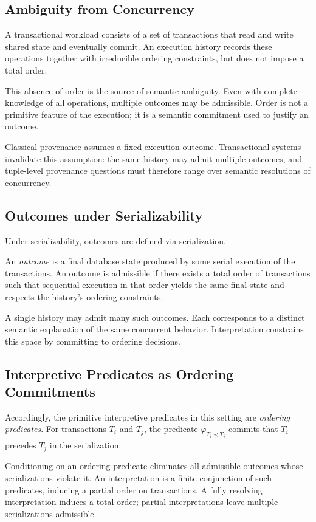 \documentclass[acmsmall,nonacm]{acmart}
\theoremstyle{remark}
\numberwithin{definition}{section}
\numberwithin{theorem}{section}
\numberwithin{lemma}{section}
\numberwithin{corollary}{section}
\numberwithin{remark}{section}
\numberwithin{example}{section}
\numberwithin{observation}{section}
\numberwithin{assumption}{section}
\begin{document}
\subsection{Ambiguity from Concurrency}

A transactional workload consists of a set of transactions that read and write
shared state and eventually commit.
An execution history records these operations together with irreducible ordering
constraints, but does not impose a total order.

This absence of order is the source of semantic ambiguity.
Even with complete knowledge of all operations, multiple outcomes may be
admissible.
Order is not a primitive feature of the execution; it is a semantic commitment
used to justify an outcome.

Classical provenance assumes a fixed execution outcome.
Transactional systems invalidate this assumption: the same history may admit
multiple outcomes, and tuple-level provenance questions must therefore range over
semantic resolutions of concurrency.

\subsection{Outcomes under Serializability}

Under serializability, outcomes are defined via serialization.

An \emph{outcome} is a final database state produced by some serial execution of
the transactions.
An outcome is admissible if there exists a total order of transactions such that
sequential execution in that order yields the same final state and respects the
history’s ordering constraints.

A single history may admit many such outcomes.
Each corresponds to a distinct semantic explanation of the same concurrent
behavior.
Interpretation constrains this space by committing to ordering decisions.

\subsection{Interpretive Predicates as Ordering Commitments}

Accordingly, the primitive interpretive predicates in this setting are
\emph{ordering predicates}.
For transactions $T_i$ and $T_j$, the predicate
$\varphi_{T_i \prec T_j}$ commits that $T_i$ precedes $T_j$ in the serialization.

Conditioning on an ordering predicate eliminates all admissible outcomes whose
serializations violate it.
An interpretation is a finite conjunction of such predicates, inducing a partial
order on transactions.
A fully resolving interpretation induces a total order; partial interpretations
leave multiple serializations admissible.
\end{document}
